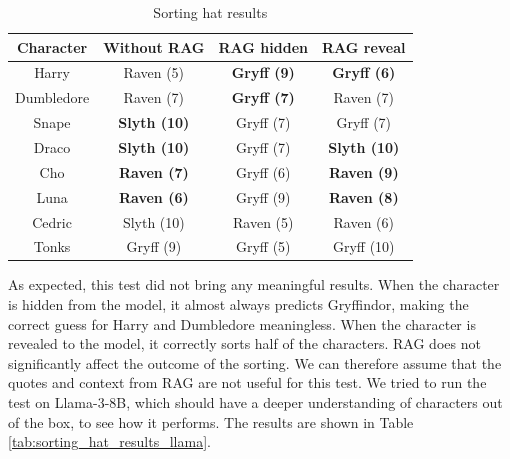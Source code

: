 \documentclass[fleqn,moreauthors,10pt]{ds_report}
\begin{document}
\begin{table}[hbt]
	\caption{Sorting hat results}
	\centering
	\begin{tabular}{c | c | c | c }
		Character  & Without RAG         & RAG hidden         & RAG reveal          \\ \hline
		Harry      & Raven (5)           & \textbf{Gryff (9)} & \textbf{Gryff (6)}  \\
		Dumbledore & Raven (7)           & \textbf{Gryff (7)} & Raven (7)           \\ \hline
		Snape      & \textbf{Slyth (10)} & Gryff (7)          & Gryff (7)           \\
		Draco      & \textbf{Slyth (10)} & Gryff (7)          & \textbf{Slyth (10)} \\ \hline
		Cho        & \textbf{Raven (7)}  & Gryff (6)          & \textbf{Raven (9)}  \\
		Luna       & \textbf{Raven (6)}  & Gryff (9)          & \textbf{Raven (8)}  \\ \hline
		Cedric     & Slyth (10)          & Raven (5)          & Raven (6)           \\
		Tonks      & Gryff (9)           & Gryff (5)          & Gryff (10)          \\
	\end{tabular}
	\label{tab:sorting_hat_results}
\end{table}


As expected, this test did not bring any meaningful results.
When the character is hidden from the model, it almost always predicts Gryffindor, making the correct guess for Harry and Dumbledore meaningless.
When the character is revealed to the model, it correctly sorts half of the characters.
RAG does not significantly affect the outcome of the sorting.
We can therefore assume that the quotes and context from RAG are not useful for this test.
We tried to run the test on Llama-3-8B, which should have a deeper understanding of characters out of the box, to see how it performs.
The results are shown in Table \ref{tab:sorting_hat_results_llama}.
\end{document}
